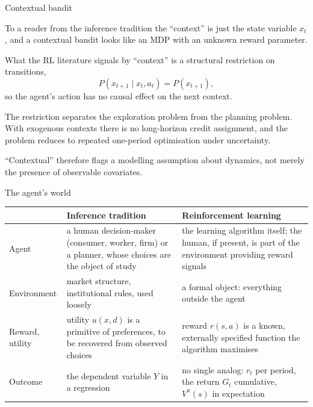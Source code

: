 \begin{frame}{Contextual bandit}

To a reader from the inference tradition the ``context'' is just the state variable
$x_t$, and a contextual bandit looks like an MDP with an unknown reward parameter.

\bigskip
What the RL literature signals by ``context'' is a structural restriction on
transitions,
\[
  P(x_{t+1} \mid x_t, a_t) = P(x_{t+1}),
\]
so the agent's action has \alert{no causal effect} on the next context.

\bigskip
The restriction separates the exploration problem from the planning problem. With
exogenous contexts there is no long-horizon credit assignment, and the problem
reduces to repeated one-period optimisation under uncertainty.

\bigskip
``Contextual'' therefore flags a modelling assumption about dynamics, not merely
the presence of observable covariates.
\end{frame}

\begin{frame}{The agent's world}
\small
\begin{tabularx}{\textwidth}{@{}l>{\raggedright\arraybackslash}X>{\raggedright\arraybackslash}X@{}}
\toprule
 & \color{rlblue}Inference tradition & \color{rlorange}Reinforcement learning \\
\midrule
Agent
  & a human decision-maker (consumer, worker, firm) or a planner, whose choices are
    the object of study
  & the learning algorithm itself; the human, if present, is part of the
    environment providing reward signals \\
Environment
  & market structure, institutional rules, used loosely
  & a formal object: everything outside the agent \\
Reward, utility
  & utility $u(x,d)$ is a primitive of preferences, to be recovered from observed
    choices
  & reward $r(s,a)$ is a known, externally specified function the algorithm
    maximises \\
Outcome
  & the dependent variable $Y$ in a regression
  & no single analog: $r_t$ per period, the return $G_t$ cumulative, $V^\pi(s)$ in
    expectation \\
\bottomrule
\end{tabularx}
\end{frame}

